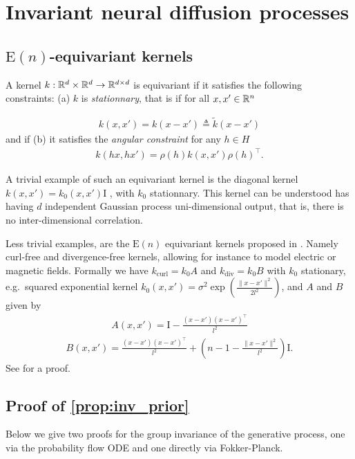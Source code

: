 \section{Invariant neural diffusion processes}
\label{sec:inv_ndp}

\subsection{$\mathrm{E}(n)$-equivariant kernels}
\label{sec:en_equiv_kernels}

A kernel $k: \mathbb{R}^d \times \mathbb{R}^d \rightarrow \mathbb{R}^{d\times d}$ is equivariant if it satisfies the following constraints: (a) $k$ is \emph{stationnary}, that is if for all $x, x' \in \mathbb{R}^n$ 

\begin{align} k(x, x') = k(x - x') \triangleq \tilde{k}(x - x') \end{align} and if (b) it satisfies the \emph{angular constraint} for any $h \in H$ \begin{align} k(h x, h x') = \rho(h) k(x, x') \rho(h)^\top.
\end{align}

A trivial example of such an equivariant kernel is the diagonal kernel $k(x,x') = k_0(x, x') \mathrm{I}$ \parencite{holderrieth2021equivariant}, with $k_0$ stationnary.
This kernel can be understood has having $d$ independent Gaussian process uni-dimensional output, that is, there is no inter-dimensional correlation.

Less trivial examples, are the $\mathrm{E}(n)$ equivariant kernels proposed in \textcite{macedo2010learning}.
Namely curl-free and divergence-free kernels, allowing for instance to model electric or magnetic ﬁelds.
Formally we have $k_\mathrm{curl} = k_0 A$ and $k_\mathrm{div} = k_0 B$ with $k_0$ stationary, e.g.\ squared exponential kernel $k_0(x, x') = \sigma^2 \exp\left(\frac{\| x - x' \|^2}{2 l^2} \right)$, and $A$ and $B$ given by \begin{align} A(x, x') = \mathrm{I} - \frac{(x - x')(x - x')^\top}{l^2} \end{align} \begin{align} B(x, x') = \frac{(x - x')(x - x')^\top}{l^2} + \left( n -1 - \frac{\|x - x' \|^2}{l^2} \right) \mathrm{I}.
\end{align}
See \textcite[Appendix C, ][]{holderrieth2021equivariant} for a proof.

\subsection{Proof of \cref{prop:inv_prior}}
\label{sec:proof_inv_prior}
Below we give two proofs for the group invariance of the generative process, one via the probability flow ODE and one directly via Fokker-Planck.

